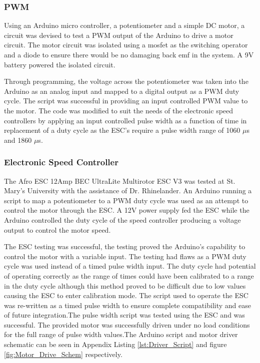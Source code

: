   \subsubsection{PWM}
  
Using an Arduino micro controller, a potentiometer and a simple DC motor, a circuit was devised to test a PWM output of the Arduino to drive a motor circuit. The motor circuit was isolated using a mosfet as the switching operator and a diode to ensure there would be no damaging back emf in the system. A 9V battery powered the isolated circuit.
  
Through programming, the voltage across the potentiometer was taken into the Arduino as an analog input and mapped to a digital output as a PWM duty cycle. The script was successful in providing an input controlled PWM value to the motor. The code was modified to suit the needs of the electronic speed controllers by applying an input controlled pulse width as a function of time in replacement of a duty cycle as the ESC's require a pulse width range of 1060 $\mu$s and 1860 $\mu$s.

  
  \subsubsection{Electronic Speed Controller}
  
The Afro ESC 12Amp BEC UltraLite Multirotor ESC V3 was tested at St. Mary's University with the assistance of Dr. Rhinelander. An Arduino running a script to map a potentiometer to a PWM duty cycle was used as an attempt to control the motor through the ESC. A 12V power supply fed the ESC while the Arduino controlled the duty cycle of the speed controller producing a voltage output to control the motor speed. 

The ESC testing was successful, the testing proved the Arduino's capability to control the motor with a variable input. The testing had flaws as a PWM duty cycle was used instead of a timed pulse width input. The duty cycle had potential of operating correctly as the range of times could have been calibrated to a range in the duty cycle although this method proved to be difficult due to low values causing the ESC to enter calibration mode. The script used to operate the ESC was re-written as a timed pulse width to ensure complete compatibility and ease of future integration.The pulse width script was tested using the ESC and was successful. The provided motor was successfully driven under no load conditions for the full range of pulse width values.The Arduino script and motor driver schematic can be seen in Appendix Listing \ref{lst:Driver_Script} and figure \ref{fig:Motor_Drive_Schem} respectively.

